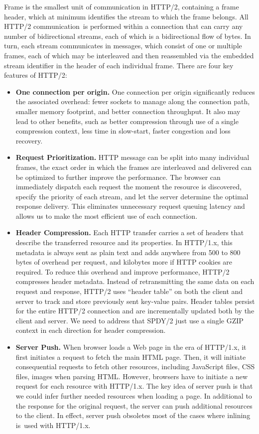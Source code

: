 Frame is the smallest unit of communication in HTTP/2, containing a frame header, which at minimum identifies the stream to which the frame belongs. All HTTP/2 communication is performed within a connection that can carry any number of bidirectional streams, each of which is a bidirectional flow of bytes. In turn, each stream communicates in messages, which consist of one or multiple frames, each of which may be interleaved and then reassembled via the embedded stream identifier in the header of each individual frame. There are four key features of HTTP/2:

\begin{itemize}
    \item{\textbf{One connection per origin.} One connection per origin significantly reduces the associated overhead: fewer sockets to manage along the connection path, smaller memory footprint, and better connection throughput. It also may lead to other benefits, such as better compression through use of a single compression context, less time in slow-start, faster congestion and loss recovery.}
    \item{\textbf{Request Prioritization.} HTTP message can be split into many individual frames, the exact order in which the frames are interleaved and delivered can be optimized to further improve the performance. The browser can immediately dispatch each request the moment the resource is discovered, specify the priority of each stream, and let the server determine the optimal response delivery. This eliminates unnecessary request queuing latency and allows us to make the most efficient use of each connection. }
    \item{\textbf{Header Compression.} Each HTTP transfer carries a set of headers that describe the transferred resource and its properties. In HTTP/1.x, this metadata is always sent as plain text and adds anywhere from 500 to 800 bytes of overhead per request, and kilobytes more if HTTP cookies are required. To reduce this overhead and improve performance, HTTP/2 compresses header metadata. Instead of retransmitting the same data on each request and response, HTTP/2 uses ``header table'' on both the client and server to track and store previously sent key-value pairs. Header tables persist for the entire HTTP/2 connection and are incrementally updated both by the client and server. We need to address that SPDY/2 just use a single GZIP context in each direction for header compression.}
    \item{\textbf{Server Push.} When browser loads a Web page in the era of HTTP/1.x, it first initiates a request to fetch the main HTML page. Then, it will initiate consequential requests to fetch other resources, including JavaScript files, CSS files, images when parsing HTML. However, browsers have to initiate a new request for each resource with HTTP/1.x. The key idea of server push is that we could infer further needed resources when loading a page. In additional to the response for the original request, the server can push additional resources to the client. In effect, server push obsoletes most of the cases where inlining is used with HTTP/1.x.}
\end{itemize}